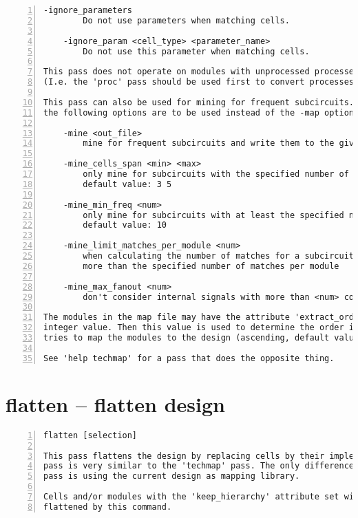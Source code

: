 \begin{lstlisting}[numbers=left,frame=single]
    -ignore_parameters
        Do not use parameters when matching cells.

    -ignore_param <cell_type> <parameter_name>
        Do not use this parameter when matching cells.

This pass does not operate on modules with unprocessed processes in it.
(I.e. the 'proc' pass should be used first to convert processes to netlists.)

This pass can also be used for mining for frequent subcircuits. In this mode
the following options are to be used instead of the -map option.

    -mine <out_file>
        mine for frequent subcircuits and write them to the given ilang file

    -mine_cells_span <min> <max>
        only mine for subcircuits with the specified number of cells
        default value: 3 5

    -mine_min_freq <num>
        only mine for subcircuits with at least the specified number of matches
        default value: 10

    -mine_limit_matches_per_module <num>
        when calculating the number of matches for a subcircuit, don't count
        more than the specified number of matches per module

    -mine_max_fanout <num>
        don't consider internal signals with more than <num> connections

The modules in the map file may have the attribute 'extract_order' set to an
integer value. Then this value is used to determine the order in which the pass
tries to map the modules to the design (ascending, default value is 0).

See 'help techmap' for a pass that does the opposite thing.
\end{lstlisting}

\section{flatten -- flatten design}
\label{cmd:flatten}
\begin{lstlisting}[numbers=left,frame=single]
    flatten [selection]

This pass flattens the design by replacing cells by their implementation. This
pass is very similar to the 'techmap' pass. The only difference is that this
pass is using the current design as mapping library.

Cells and/or modules with the 'keep_hierarchy' attribute set will not be
flattened by this command.
\end{lstlisting}

